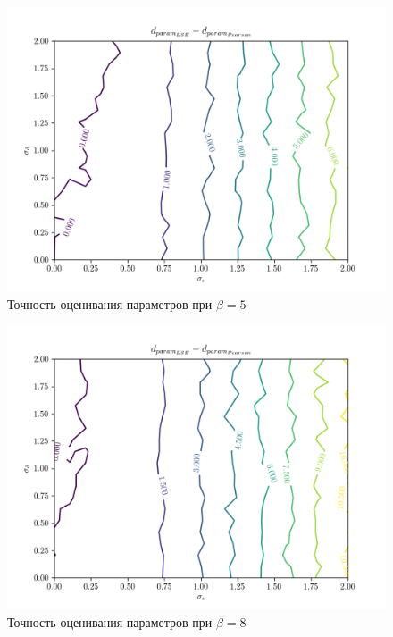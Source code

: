 \begin{figure}[h]
  \centering
  \includegraphics[width=150mm]{fig/linear/param/beta-5_param.png}
  \caption{Точность оценивания параметров при \( \beta = 5 \)}
\end{figure}

\begin{figure}[h]
  \centering
  \includegraphics[width=150mm]{fig/linear/param/beta-8_param.png}
  \caption{Точность оценивания параметров при \( \beta = 8 \)}
\end{figure}
